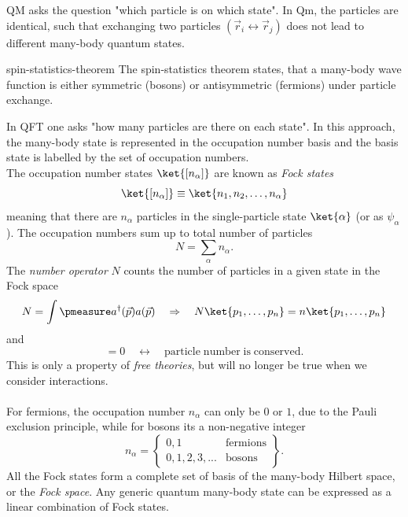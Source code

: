 QM asks the question "which particle is on which state". In Qm, the particles are identical, such that exchanging two particles $(\vec{r}_i \leftrightarrow \vec{r}_j)$ does not lead to different many-body quantum states.
\begin{mybox}{spin-statistics-theorem}
	The spin-statistics theorem states, that a many-body wave function is either symmetric (bosons) or antisymmetric (fermions) under particle exchange.
\end{mybox}
In QFT one asks "how many particles are there on each state". In this approach, the many-body state is represented in the occupation number basis and the basis state is labelled by the set of occupation numbers. \\
The occupation number states $\ket{[n_{\alpha}]}$ are known as \emph{Fock states}
\begin{equation}
	\ket{[n_{\alpha}]} \equiv \ket{n_1,n_2,\dots,n_{\alpha}}
\end{equation}
meaning that there are $n_{\alpha}$ particles in the single-particle state $\ket{\alpha}$ (or as $\psi_{\alpha}$). The occupation numbers sum up to total number of particles 
\begin{equation}
	N=\sum_{\alpha} n_{\alpha}.
\end{equation}
The \emph{number operator} $N$ counts the number of particles in a given state in the Fock space
\begin{equation}
	N=\int \pmeasure a^{\dagger}(\vec{p}) a(\vec{p}) \quad \Rightarrow \quad N\ket{p_1,\dots,p_n} = n \ket{p_1,\dots,p_n}
\end{equation}
and
\begin{equation}
[N,H]=0 \quad \leftrightarrow \quad \mathrm{particle \; number \; is \; conserved}.
\end{equation}
This is only a property of \emph{free theories}, but will no longer be true when we consider interactions.\\
\\
For fermions, the occupation number $n_{\alpha}$ can only be $0$ or $1$, due to the Pauli exclusion principle, while for bosons its a non-negative integer
\begin{equation}
	n_{\alpha} = \left\{ \begin{array}{lr}
	0,1 & \mathrm{fermions} \\
	0,1,2,3,... & \mathrm{bosons}
	\end{array}\right\}.
\end{equation}
All the Fock states form a complete set of basis of the many-body Hilbert space, or the \emph{Fock space}. Any generic quantum many-body state can be expressed as a linear combination of Fock states.\\
